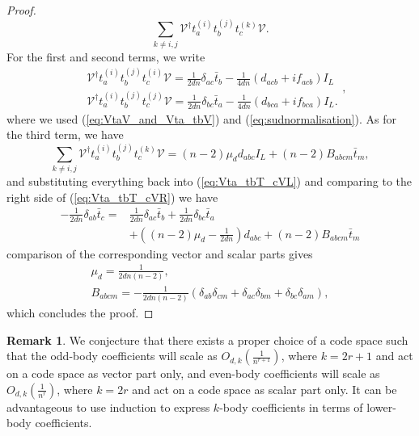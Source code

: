 \documentclass[11pt,letterpaper]{article}
\theoremstyle{plain}
\theoremstyle{plain}
\theoremstyle{plain}
\theoremstyle{plain}
\theoremstyle{plain}
\theoremstyle{plain}
\theoremstyle{plain}
\theoremstyle{definition}
\newtheorem{smremark}[smtheorem]{Remark}
\theoremstyle{plain}
\begin{document}
\begin{proof}
\begin{equation}
        \sum_{k \neq i, j} \mathcal{V}^{\dagger} t_a^{(i)} t_b^{(j)} t_c^{(k)} \mathcal{V} .
    \end{equation}
    For the first and second terms, we write
    \[
        \begin{aligned}
        &\mathcal{V}^{\dagger} t_a^{(i)} t_b^{(j)} t_c^{(i)} \mathcal{V}=\frac{1}{2 d n} \delta_{a c} \bar{t}_b-\frac{1}{4 d n}\left(d_{a c b}+i f_{a c b}\right) I_L\\
        &\mathcal{V}^{\dagger} t_a^{(i)} t_b^{(j)} t_c^{(j)} \mathcal{V}=\frac{1}{2 d n} \delta_{b c} \bar{t}_a-\frac{1}{4 d n}\left(d_{b c a}+i f_{b c a}\right) I_L .
        \end{aligned},
    \]
    where we used (\ref{eq:VtaV_and_Vta_tbV}) and (\ref{eq:sudnormalisation}). As for the third term, we have
    \[
        \sum_{k \neq i, j} \mathcal{V}^{\dagger} t_a^{(i)} t_b^{(j)} t_c^{(k)} \mathcal{V}=(n-2) \mu_d d_{a b c} I_L+(n-2) B_{a b c m} \bar{t}_m,
    \]
    and substituting everything back into (\ref{eq:Vta_tbT_cVL}) and comparing to the right side of (\ref{eq:Vta_tbT_cVR}) we have
    \[
        \begin{aligned}
        -\frac{1}{2 d n} \delta_{a b} \bar{t}_c = & \frac{1}{2 d n} \delta_{a c} \bar{t}_b +\frac{1}{2 d n} \delta_{b c} \bar{t}_a \\
        & +\left((n-2) \mu_d-\frac{1}{2 d n}\right) d_{a b c} +(n-2) B_{a b c m} \bar{t}_m
        \end{aligned}
    \]
    comparison of the corresponding vector and scalar parts gives
    \[
        \begin{gathered}
        \mu_d=\frac{1}{2 d n(n-2)}, \\
        B_{a b c m}=-\frac{1}{2 d n(n-2)}\left(\delta_{a b} \delta_{c m}+\delta_{a c} \delta_{b m}+\delta_{b c} \delta_{a m}\right),
        \end{gathered}
    \]
    which concludes the proof.
\end{proof}

\begin{smremark}
    We conjecture that there exists a proper choice of a code space such that the odd-body coefficients will scale as $O_{d,k}\left(\frac{1}{n^{r+1}}\right)$, 
    where $k=2r+1$ and act on a code space as vector part only, and even-body coefficients will scale as $O_{d,k}\left(\frac{1}{n^r}\right)$, 
    where $k=2r$ and act on a code space as scalar part only. It can be advantageous to use induction to express $k$-body coefficients in terms of lower-body coefficients. 
\end{smremark}
\end{document}
